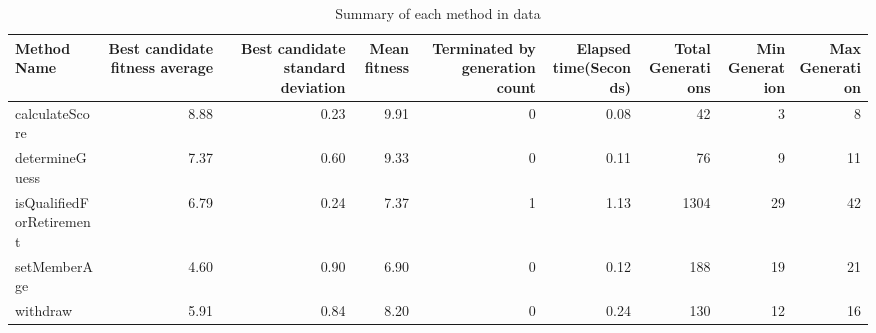 \begin{table}[ht]
\centering
\begin{tabular}{lrrrrrrrr}
  \hline
Method Name & Best candidate fitness average & Best candidate standard deviation & Mean fitness & Terminated by generation count & Elapsed time(Seconds) & Total Generations & Min Generation & Max Generation \\ 
  \hline
calculateScore & 8.88 & 0.23 & 9.91 &   0 & 0.08 &  42 &   3 &   8 \\ 
  determineGuess & 7.37 & 0.60 & 9.33 &   0 & 0.11 &  76 &   9 &  11 \\ 
  isQualifiedForRetirement & 6.79 & 0.24 & 7.37 &   1 & 1.13 & 1304 &  29 &  42 \\ 
  setMemberAge & 4.60 & 0.90 & 6.90 &   0 & 0.12 & 188 &  19 &  21 \\ 
  withdraw & 5.91 & 0.84 & 8.20 &   0 & 0.24 & 130 &  12 &  16 \\ 
   \hline
\end{tabular}
\caption{Summary of each method in data} 
\label{table:each_method_summary}
\end{table}
